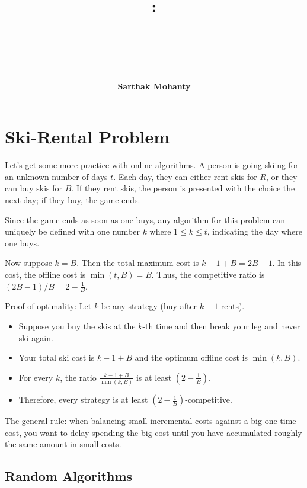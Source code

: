 \documentclass[14pt]{extreport}
\title{
    \vspace{1.75in}
    \textbf{\lectClass:\\ \lectTitle}\\
    \vspace{0.1in}\large{\textit{\lectClassInstructor\ \lectSection}}
    \vspace{2in}
    \author{\textbf{Sarthak Mohanty}}
    \date{}
}
\begin{document}
\maketitle
\pagebreak

\section*{Ski-Rental Problem}
    Let's get some more practice with online algorithms. A person is going skiing for an unknown number of days $t$. Each day, they can either rent skis for $R$, or they can buy skis for $B$. If they rent skis, the person is presented with the choice the next day; if they buy, the game ends.

    \vspace{5mm}
    Since the game ends as soon as one buys, any algorithm for this problem can uniquely be defined with one number $k$ where $1 \le k \le t$, indicating the day where one buys.


    \vspace{5mm}
    Now suppose $k = B$. Then the total maximum cost is $k - 1 + B = 2B - 1$. In this cost, the offline cost is $\min(t, B) = B$. Thus, the competitive ratio is $(2B - 1) / B = 2 - \frac{1}{B}$.

    \vspace{5mm}
    Proof of optimality: Let $k$ be any strategy (buy after $k-1$ rents).
    \begin{itemize}
        \item Suppose you buy the skis at the $k$-th time and then break your leg and never ski again.
        \item Your total ski cost is $k-1+B$ and the optimum offline cost is $\min(k,B)$.
        \item For every $k$, the ratio $\frac{k-1+B}{\min(k,B)}$ is at least $(2-\frac{1}{B})$.
        \item Therefore, every strategy is at least $(2-\frac{1}{B})$-competitive.
    \end{itemize}

    
    The general rule: when balancing small incremental costs against a big one-time cost, you want to delay spending the big cost until you have accumulated roughly the same amount in small costs.

\subsection*{Random Algorithms}
    
\end{document}
